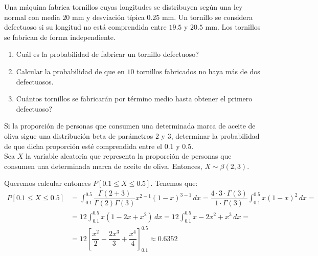 \begin{ejercicio}
    Una máquina fabrica tornillos cuyas longitudes se distribuyen según una ley normal con media $20$ mm y desviación típica $0.25$ mm. Un tornillo se considera defectuoso si su longitud no está comprendida entre $19.5$ y $20.5$ mm. Los tornillos se fabrican de forma independiente.
    \begin{enumerate}
        \item Cuál es la probabilidad de fabricar un tornillo defectuoso?
        \item Calcular la probabilidad de que en $10$ tornillos fabricados no haya más de dos defectuosos.
        \item Cuántos tornillos se fabricarán por término medio hasta obtener el primero defectuoso?
    \end{enumerate}
\end{ejercicio}

\begin{ejercicio}
    Si la proporción de personas que consumen una determinada marca de aceite de oliva sigue una distribución beta de parámetros $2$ y $3$, determinar la probabilidad de que dicha proporción esté comprendida entre el $0.1$ y $0.5$.\\

    Sea $X$ la variable aleatoria que representa la proporción de personas que consumen una determinada marca de aceite de oliva. Entonces, $X\sim \beta(2,3)$.

    Queremos calcular entonces $P[0.1\leq X\leq 0.5]$. Tenemos que:
    \begin{align*}
        P[0.1\leq X\leq 0.5] &= \int_{0.1}^{0.5} \dfrac{\Gamma(2+3)}{\Gamma(2)\Gamma(3)} x^{2-1} (1-x)^{3-1} \, dx = 
        \dfrac{4\cdot 3\cdot \Gamma(3)}{1\cdot \Gamma(3)}
        \int_{0.1}^{0.5} x (1-x)^{2} \, dx
        =\\&= 12\int_{0.1}^{0.5} x(1-2x+x^2) \, dx
        = 
        12\int_{0.1}^{0.5} x-2x^2+x^3 \, dx
        =\\&= 12\left[\dfrac{x^2}{2}-\dfrac{2x^3}{3}+\dfrac{x^4}{4}\right]_{0.1}^{0.5}
        \approx 0.6352
    \end{align*}
\end{ejercicio}

